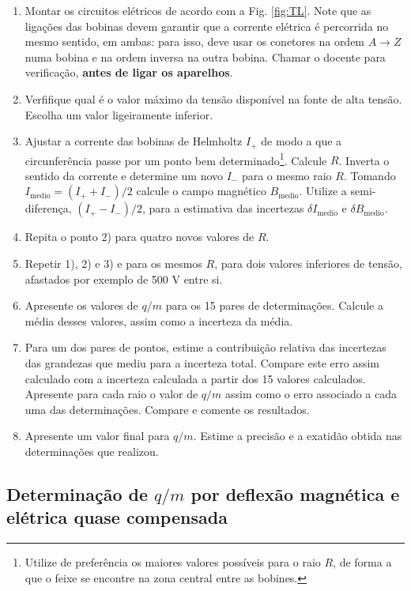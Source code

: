 \documentclass[12pt,a4paper,oneside]{paper}
\begin{document}
\begin{enumerate}
	\item Montar os circuitos elétricos de acordo com a  Fig. \ref{fig:TL}. Note que as ligações das bobinas devem garantir
    que a corrente elétrica é percorrida no mesmo sentido, em ambas: para isso, deve usar os conetores na ordem
    $A\rightarrow Z$ numa bobina e na ordem inversa na outra bobina. Chamar o docente para verificação, \textbf{antes de ligar os aparelhos}.
	\item Verfifique qual é o valor máximo da tensão disponível na fonte de alta tensão. Escolha um valor ligeiramente inferior.
	\item Ajustar a corrente das bobinas de Helmholtz $I_+$ de modo a que a circunferência passe por um ponto bem
    determinado\footnote{Utilize de preferência os maiores valores possíveis para o raio $R$, de forma a que o feixe
    se encontre na zona central entre as bobines.}.  Calcule $R$.
	Inverta o sentido da corrente e determine um novo $I_-$ para o mesmo raio $R$.
	Tomando $I_{\textrm{medio}} = (I_+ + I_-)/2 $ calcule o campo magnético $B_{\textrm{medio}}$. Utilize a semi-diferença,
     $(I_+ - I_-)/2$, para a estimativa das incertezas $\delta I_{\textrm{medio}}$ e $\delta B_{\textrm{medio}}$.
	\item Repita o ponto 2) para quatro novos valores de $R$. 
	\item Repetir 1), 2) e 3)  e para os mesmos $R$, para dois valores inferiores de tensão, afastados por exemplo de 500 V entre si.
	\item Apresente os valores de $q/m$ para os 15 pares de determinações. Calcule a média desses valores, assim como a incerteza da média.
	\item Para um dos pares de pontos, estime a contribuição relativa das incertezas das grandezas que mediu para a incerteza total. Compare este erro assim calculado com a incerteza calculada a partir dos 15 valores calculados.
	Apresente para cada raio o valor de $q/m$ assim como o erro associado a cada uma das determinações. Compare e comente os resultados.
	\item Apresente um valor final para $q/m$. Estime a precisão e a exatidão obtida nas determinações que realizou.
\end{enumerate}
 
\subsection{\sf Determinação de $q/m$ por deflexão magnética e elétrica quase compensada }
\end{document}
